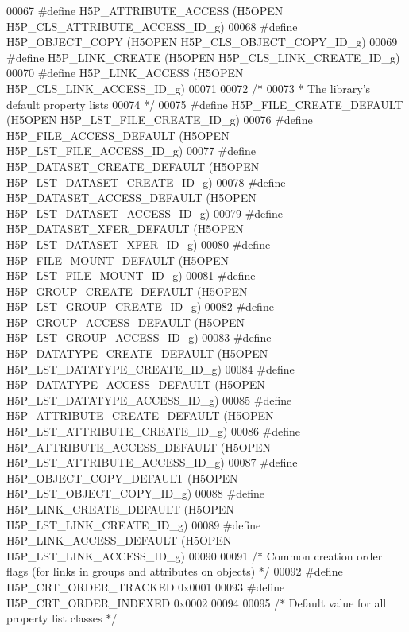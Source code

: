 \begin{DoxyCode}
00067 \textcolor{preprocessor}{#define H5P\_ATTRIBUTE\_ACCESS        (H5OPEN H5P\_CLS\_ATTRIBUTE\_ACCESS\_ID\_g)}
00068 \textcolor{preprocessor}{#define H5P\_OBJECT\_COPY         (H5OPEN H5P\_CLS\_OBJECT\_COPY\_ID\_g)}
00069 \textcolor{preprocessor}{#define H5P\_LINK\_CREATE         (H5OPEN H5P\_CLS\_LINK\_CREATE\_ID\_g)}
00070 \textcolor{preprocessor}{#define H5P\_LINK\_ACCESS         (H5OPEN H5P\_CLS\_LINK\_ACCESS\_ID\_g)}
00071 
00072 \textcolor{comment}{/*}
00073 \textcolor{comment}{ * The library's default property lists}
00074 \textcolor{comment}{ */}
00075 \textcolor{preprocessor}{#define H5P\_FILE\_CREATE\_DEFAULT     (H5OPEN H5P\_LST\_FILE\_CREATE\_ID\_g)}
00076 \textcolor{preprocessor}{#define H5P\_FILE\_ACCESS\_DEFAULT     (H5OPEN H5P\_LST\_FILE\_ACCESS\_ID\_g)}
00077 \textcolor{preprocessor}{#define H5P\_DATASET\_CREATE\_DEFAULT      (H5OPEN H5P\_LST\_DATASET\_CREATE\_ID\_g)}
00078 \textcolor{preprocessor}{#define H5P\_DATASET\_ACCESS\_DEFAULT      (H5OPEN H5P\_LST\_DATASET\_ACCESS\_ID\_g)}
00079 \textcolor{preprocessor}{#define H5P\_DATASET\_XFER\_DEFAULT    (H5OPEN H5P\_LST\_DATASET\_XFER\_ID\_g)}
00080 \textcolor{preprocessor}{#define H5P\_FILE\_MOUNT\_DEFAULT          (H5OPEN H5P\_LST\_FILE\_MOUNT\_ID\_g)}
00081 \textcolor{preprocessor}{#define H5P\_GROUP\_CREATE\_DEFAULT    (H5OPEN H5P\_LST\_GROUP\_CREATE\_ID\_g)}
00082 \textcolor{preprocessor}{#define H5P\_GROUP\_ACCESS\_DEFAULT    (H5OPEN H5P\_LST\_GROUP\_ACCESS\_ID\_g)}
00083 \textcolor{preprocessor}{#define H5P\_DATATYPE\_CREATE\_DEFAULT (H5OPEN H5P\_LST\_DATATYPE\_CREATE\_ID\_g)}
00084 \textcolor{preprocessor}{#define H5P\_DATATYPE\_ACCESS\_DEFAULT     (H5OPEN H5P\_LST\_DATATYPE\_ACCESS\_ID\_g)}
00085 \textcolor{preprocessor}{#define H5P\_ATTRIBUTE\_CREATE\_DEFAULT    (H5OPEN H5P\_LST\_ATTRIBUTE\_CREATE\_ID\_g)}
00086 \textcolor{preprocessor}{#define H5P\_ATTRIBUTE\_ACCESS\_DEFAULT    (H5OPEN H5P\_LST\_ATTRIBUTE\_ACCESS\_ID\_g)}
00087 \textcolor{preprocessor}{#define H5P\_OBJECT\_COPY\_DEFAULT     (H5OPEN H5P\_LST\_OBJECT\_COPY\_ID\_g)}
00088 \textcolor{preprocessor}{#define H5P\_LINK\_CREATE\_DEFAULT     (H5OPEN H5P\_LST\_LINK\_CREATE\_ID\_g)}
00089 \textcolor{preprocessor}{#define H5P\_LINK\_ACCESS\_DEFAULT     (H5OPEN H5P\_LST\_LINK\_ACCESS\_ID\_g)}
00090 
00091 \textcolor{comment}{/* Common creation order flags (for links in groups and attributes on objects) */}
00092 \textcolor{preprocessor}{#define H5P\_CRT\_ORDER\_TRACKED           0x0001}
00093 \textcolor{preprocessor}{#define H5P\_CRT\_ORDER\_INDEXED           0x0002}
00094 
00095 \textcolor{comment}{/* Default value for all property list classes */}

\end{DoxyCode}

